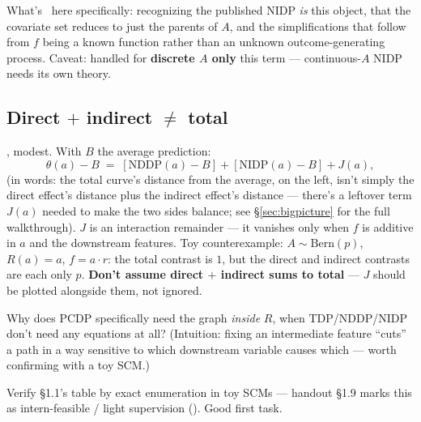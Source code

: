 What's \newtag~here specifically: recognizing the published NIDP \emph{is}
this object, that the covariate set reduces to just the parents of $A$, and
the simplifications that follow from $f$ being a known function rather than
an unknown outcome-generating process. Caveat: handled for
\textbf{discrete $A$ only} this term --- continuous-$A$ NIDP needs its own
theory.

\subsection{Direct \texorpdfstring{$+$}{+} indirect \texorpdfstring{$\neq$}{!=} total}

\newtag, modest. With $B$ the average prediction:
\[
  \theta(a) - B \;=\; [\mathrm{NDDP}(a) - B] + [\mathrm{NIDP}(a) - B] + J(a),
\]
(in words: the total curve's distance from the average, on the left, isn't
simply the direct effect's distance plus the indirect effect's distance ---
there's a leftover term $J(a)$ needed to make the two sides balance; see
\S\ref{sec:bigpicture} for the full walkthrough). $J$ is an interaction remainder --- it vanishes only when $f$ is additive in
$a$ and the downstream features. Toy counterexample: $A \sim \mathrm{Bern}(p)$,
$R(a)=a$, $f = a\cdot r$: the total contrast is $1$, but the direct and
indirect contrasts are each only $p$. \textbf{Don't assume direct $+$
indirect sums to total} --- $J$ should be plotted alongside them, not
ignored.

\begin{openquestions}
  \item Why does PCDP specifically need the graph \emph{inside} $R$, when
    TDP/NDDP/NIDP don't need any equations at all? (Intuition: fixing an
    intermediate feature ``cuts'' a path in a way sensitive to which
    downstream variable causes which --- worth confirming with a toy SCM.)
  \item Verify \S1.1's table by exact enumeration in toy SCMs --- handout
    \S1.9 marks this as intern-feasible / light supervision (\feasyes).
    Good first task.
\end{openquestions}

